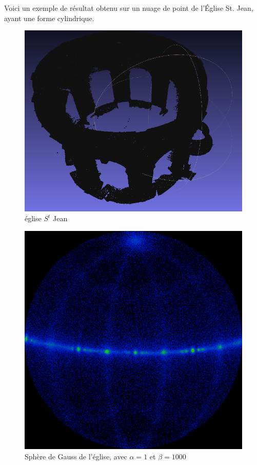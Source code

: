 \documentclass{article}
\begin{document}
Voici un exemple de résultat obtenu sur un nuage de point de l'Église St. Jean, ayant une forme cylindrique.


\begin{multicols}{2}
\begin{figure}[H]
\centering
\includegraphics[width=\columnwidth]{../2014-02-28-102010_713x591_scrot.png}
\caption{église $S^t$ Jean}
\end{figure}

\columnbreak

\begin{figure}[H]
\centering
\includegraphics[width=\columnwidth]{../gauss_st_jean.png}
\caption{Sphère de Gauss de l'église, avec $\alpha=1$ et $\beta=1000$}
\end{figure}
\end{multicols}
\end{document}
